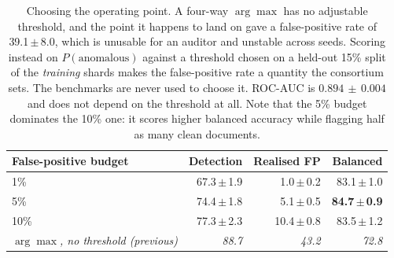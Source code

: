 \begin{table}[htbp]
\centering
\caption{Choosing the operating point. A four-way $\arg\max$ has no adjustable
threshold, and the point it happens to land on gave a false-positive rate of
39.1\,$\pm$\,8.0, which is unusable for an auditor and unstable across seeds. Scoring
instead on $P(\text{anomalous})$ against a threshold chosen on a held-out 15\%
split of the \emph{training} shards makes the false-positive rate a quantity the
consortium sets. The benchmarks are never used to choose it. ROC-AUC is
$0.894\,\pm\,0.004$ and does not depend on the threshold at all. Note that the
5\% budget dominates the 10\% one: it scores higher balanced accuracy while
flagging half as many clean documents.}
\label{tab:corpus_operating}
\small
\begin{tabular}{@{}l r r r@{}}
\toprule
\textbf{False-positive budget} & \textbf{Detection} & \textbf{Realised FP} &
\textbf{Balanced} \\
\midrule
1\%  & 67.3\,$\pm$\,1.9 &  1.0\,$\pm$\,0.2 & 83.1\,$\pm$\,1.0 \\
5\%  & 74.4\,$\pm$\,1.8 &  5.1\,$\pm$\,0.5 & \textbf{84.7\,$\pm$\,0.9} \\
10\% & 77.3\,$\pm$\,2.3 & 10.4\,$\pm$\,0.8 & 83.5\,$\pm$\,1.2 \\
\midrule
\textit{$\arg\max$, no threshold (previous)} & \textit{88.7} & \textit{43.2} &
  \textit{72.8} \\
\bottomrule
\end{tabular}
\end{table}

